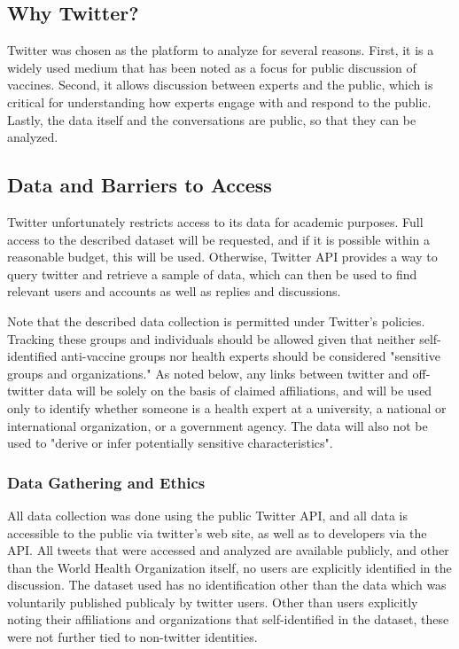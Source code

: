 \documentclass{article}
\begin{document}
\subsection{Why Twitter?}
Twitter was chosen as the platform to analyze for several reasons. First, it is a widely used medium that has been noted as a focus for public discussion of vaccines. Second, it allows discussion between experts and the public, which is critical for understanding how experts engage with and respond to the public. Lastly, the data itself and the conversations are public, so that they can be analyzed.

\subsection{Data and Barriers to Access}
Twitter unfortunately restricts access to its data for academic purposes. \cite{Alaimo2018} Full access to the described dataset will be requested, and if it is possible within a reasonable budget, this will be used. Otherwise, Twitter API provides a way to query twitter and retrieve a sample of data, which can then be used to find relevant users and accounts as well as replies and discussions. 

Note that the described data collection is permitted under Twitter's policies. Tracking these groups and individuals should be allowed given that neither self-identified anti-vaccine groups nor health experts should be considered "sensitive groups and organizations." As noted below, any links between twitter and off-twitter data will be solely on the basis of claimed affiliations, and will be used only to identify whether someone is a health expert at a university, a national or international organization, or a government agency. The data will also not be used to "derive or infer potentially sensitive characteristics".

\subsubsection{Data Gathering and Ethics}
All data collection was done using the public Twitter API, and all data is accessible to the public via twitter's web site, as well as to developers via the API. All tweets that were accessed and analyzed are available publicly, and other than the World Health Organization itself, no users are explicitly identified in the discussion. The dataset used has no identification other than the data which was voluntarily published publicaly by twitter users. Other than users explicitly noting their affiliations and organizations that self-identified in the dataset, these were not further tied to non-twitter identities.
\end{document}
